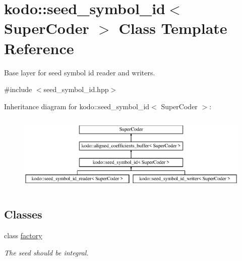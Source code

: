\hypertarget{classkodo_1_1seed__symbol__id}{\section{kodo\-:\-:seed\-\_\-symbol\-\_\-id$<$ Super\-Coder $>$ Class Template Reference}
\label{classkodo_1_1seed__symbol__id}
}


Base layer for seed symbol id reader and writers.  




{\ttfamily \#include $<$seed\-\_\-symbol\-\_\-id.\-hpp$>$}

Inheritance diagram for kodo\-:\-:seed\-\_\-symbol\-\_\-id$<$ Super\-Coder $>$\-:\begin{figure}[H]
\begin{center}
\leavevmode
\includegraphics[height=3.733333cm]{classkodo_1_1seed__symbol__id}
\end{center}
\end{figure}
\subsection*{Classes}
\begin{DoxyCompactItemize}
\item 
class \hyperlink{classkodo_1_1seed__symbol__id_1_1factory}{factory}
\begin{DoxyCompactList}\small\item\em The seed should be integral. \end{DoxyCompactList}\end{DoxyCompactItemize}
